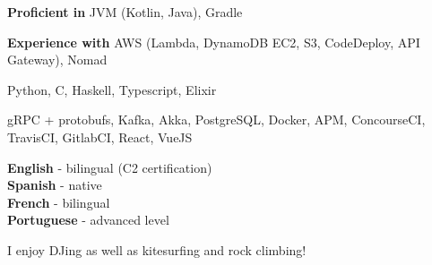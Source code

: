 \documentclass[9pt]{developercv}
\newcommand{\para}{\vspace{0.4em}}
\begin{document}
    \vspace{1.2em}
    \begin{minipage}[t]{0.53\textwidth}
        \vspace{-\baselineskip} %


        \vspace{-0.5em}
        \textbf{Proficient in} JVM (Kotlin, Java), Gradle

        \para
        \textbf{Experience with}
        AWS (Lambda, DynamoDB EC2, S3, CodeDeploy, API Gateway), Nomad

        \para

        Python, C, Haskell, Typescript, Elixir

        \para

        gRPC + protobufs, Kafka, Akka, PostgreSQL, Docker, APM, ConcourseCI, TravisCI, GitlabCI, React,
        VueJS

    \end{minipage}
    \hfill
    \begin{minipage}[t]{0.45\textwidth}
        \vspace{-\baselineskip} %


        \vspace{-0.5em}
        \textbf{English} - bilingual (C2 certification)\\
        \textbf{Spanish} - native\\
        \textbf{French} - bilingual\\
        \textbf{Portuguese} - advanced level\\


        \vspace{-0.5em}
        I enjoy DJing as well as kitesurfing and rock climbing!

    \end{minipage}

\end{document}

